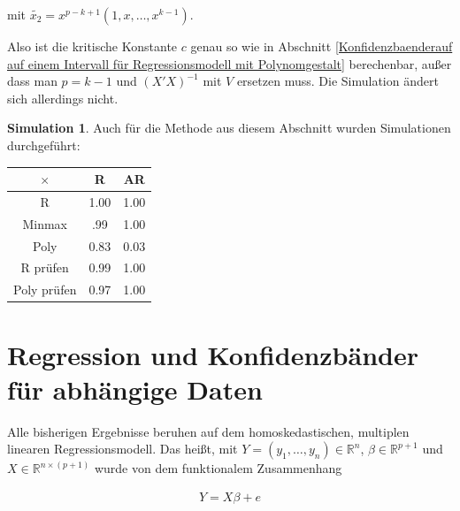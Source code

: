 \documentclass[12pt,a4paper]{article}
\theoremstyle{definition}
\theoremstyle{definition}
\theoremstyle{definition}
\newtheorem{Simulation}[Definition]{Simulation}
\theoremstyle{definition}
\newcommand{\UeberRR}{1.00}
\newcommand{\UeberRMinmax}{.99}
\newcommand{\UeberRMinmaxPoly}{0.83}
\newcommand{\UeberARR}{1.00}
\newcommand{\UeberARMinmax}{1.00}
\newcommand{\UeberARMinmaxPoly}{0.03}
\newcommand{\UeberRRpruefen}{0.99}
\newcommand{\UeberRMinmaxPolyfastpruefen}{0.97}
\newcommand{\UeberARRpruefen}{1.00}
\newcommand{\UeberARMinmaxPolyfastpruefen}{1.00}
\begin{document}
mit $\tilde{x_2}= x^{p-k+1}(1, x, \ldots, x^{k-1})$.

Also ist die kritische Konstante $c$ genau so wie in Abschnitt \ref{Konfidenzbaenderauf auf einem Intervall für Regressionsmodell mit Polynomgestalt} berechenbar, außer dass man $p=k-1$ und $(X'X)^{-1}$ mit $V$ ersetzen muss. Die Simulation ändert sich allerdings nicht.

\begin{Simulation}
Auch für die Methode aus diesem Abschnitt wurden Simulationen durchgeführt:

\begin{center}
\begin{tabular}{|c|c|c|}
\hline 
$\times$ & R & AR \\ 
\hline 
R		& \UeberRR			& \UeberARR \\ 
\hline 
Minmax	& \UeberRMinmax	 	& \UeberARMinmax \\ 
\hline 
Poly 	& \UeberRMinmaxPoly & \UeberARMinmaxPoly \\ 
\hline 
R prüfen	& \UeberRRpruefen & \UeberARRpruefen \\ 
\hline 
Poly prüfen	& \UeberRMinmaxPolyfastpruefen & \UeberARMinmaxPolyfastpruefen \\ 
\hline 
\end{tabular} 
\end{center}

\end{Simulation}





\newpage
\section{Regression und Konfidenzbänder für abhängige Daten}
\label{Regression und Konfidenzbänder für abhaengige Daten}
Alle bisherigen Ergebnisse beruhen auf dem homoskedastischen, multiplen linearen Regressionsmodell. Das heißt, mit $Y=(y_1, \ldots, y_n) \in \mathbb{R}^n$, $\beta \in \mathbb{R}^{p+1}$ und $X \in \mathbb{R}^{n \times (p+1)}$ wurde von dem funktionalem Zusammenhang

\begin{align} \label{Grundmodell_AR}
Y = X \beta + e
\end{align}
\end{document}
